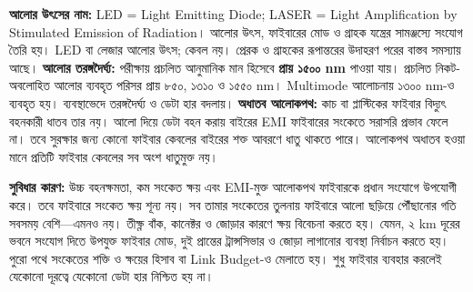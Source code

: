 \textbf{আলোর উৎসের নাম:} LED = Light Emitting Diode; LASER = Light Amplification by Stimulated Emission of Radiation। আলোর উৎস, ফাইবারের মোড ও গ্রাহক যন্ত্রের সামঞ্জস্যে সংযোগ তৈরি হয়। LED বা লেজার আলোর উৎস; কেবল নয়। প্রেরক ও গ্রাহকের রূপান্তরের উদাহরণ পরের বাস্তব সমস্যায় আছে।
\textbf{আলোর তরঙ্গদৈর্ঘ্য:} পরীক্ষায় প্রচলিত আনুমানিক মান হিসেবে \textbf{প্রায় ১৫০০ nm} পাওয়া যায়। প্রচলিত নিকট-অবলোহিত আলোর ব্যবহৃত পরিসর প্রায় ৮৫০, ১৩১০ ও ১৫৫০ nm। Multimode আলোচনায় ১৩০০ nm-ও ব্যবহৃত হয়। ব্যবস্থাভেদে তরঙ্গদৈর্ঘ্য ও ডেটা হার বদলায়।
\textbf{অধাতব আলোকপথ:} কাচ বা প্লাস্টিকের ফাইবার বিদ্যুৎ বহনকারী ধাতব তার নয়। আলো দিয়ে ডেটা বহন করায় বাইরের EMI ফাইবারের সংকেতে সরাসরি প্রভাব ফেলে না। তবে সুরক্ষার জন্য কোনো ফাইবার কেবলের বাইরের শক্ত আবরণে ধাতু থাকতে পারে। আলোকপথ অধাতব হওয়া মানে প্রতিটি ফাইবার কেবলের সব অংশ ধাতুমুক্ত নয়।

\textbf{সুবিধার কারণ:} উচ্চ বহনক্ষমতা, কম সংকেত ক্ষয় এবং EMI-মুক্ত আলোকপথ ফাইবারকে প্রধান সংযোগে উপযোগী করে। তবে ফাইবারে সংকেত ক্ষয় শূন্য নয়। সব তামার সংকেতের তুলনায় ফাইবারে আলো ছড়িয়ে পৌঁছানোর গতি সবসময় বেশি—এমনও নয়। তীক্ষ্ণ বাঁক, কানেক্টর ও জোড়ার কারণে ক্ষয় বিবেচনা করতে হয়। যেমন, ২ km দূরের ভবনে সংযোগ দিতে উপযুক্ত ফাইবার মোড, দুই প্রান্তের ট্রান্সসিভার ও জোড়া লাগানোর ব্যবস্থা নির্বাচন করতে হয়। পুরো পথে সংকেতের শক্তি ও ক্ষয়ের হিসাব বা Link Budget-ও মেলাতে হয়। শুধু ফাইবার ব্যবহার করলেই যেকোনো দূরত্বে যেকোনো ডেটা হার নিশ্চিত হয় না।
